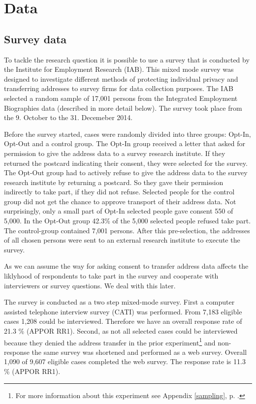 \section{Data}
\subsection {Survey data}

To tackle the research question it is possible to use a survey that is conducted by the Institute for Employment Research (IAB). This mixed mode survey was designed to investigate different methods of protecting individual privacy and transferring addresses to survey firms for data collection purposes. The IAB selected a random sample of 17,001 persons from the Integrated Employment Biographies data (described in more detail below). The survey took place from the 9. October to the 31. Decemeber 2014.

Before the survey started, cases were randomly divided into three groups: Opt-In, Opt-Out and a control group. The Opt-In group received a letter that asked for permission to give the address data to a survey research institute. If they returned the postcard indicating their consent, they were selected for the survey. The Opt-Out group had to actively refuse to give the address data to the survey research institute by returning a postcard. So they gave their permission indirectly to take part, if they did not refuse. Selected people for the control group did not get the chance to approve transport of their address data. Not surprisingly, only a small part of Opt-In selected people gave consent 550 of 5,000. In the Opt-Out group 42.3\% of the 5,000 selected people refused take part. The control-group contained 7,001 persons. After this pre-selection, the addresses of all chosen persons were sent to an external research institute to execute the survey.

As we can assume the way for asking consent to transfer address data affects the liklyhood of respondents to take part in the survey and cooperate with interviewers or survey questions. We deal with this later.   

The survey is conducted as a two step mixed-mode survey. First a computer assisted telephone interview survey (CATI) was performed. From 7,183 eligible cases 1,208 could be interviewed. Therefore we have an overall response rate of 21.3 \% (APPOR RR1). Second, as not all selected cases could be interviewed because they denied the address transfer in the prior experiment\footnote{For more information about this experiment see Appendix \ref{sampling}, p. \pageref{sampling}.} and non-response the same survey was shortened and performed as a web survey. Overall 1,090 of 9,607 eligible cases completed the web survey. The response rate is 11.3 \% (APPOR RR1).

